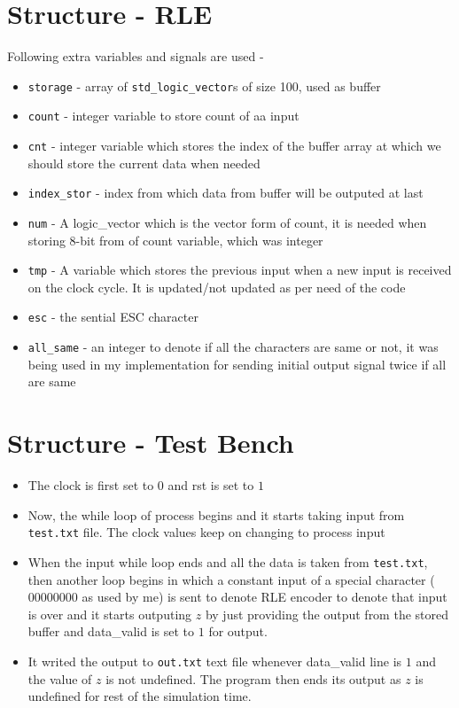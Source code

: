 \documentclass[12pt,a4paper]{article}
\begin{document}
\section{Structure - RLE}
Following extra variables and signals are used - 
\begin{itemize}
    \item \texttt{storage}  - array of \texttt{std\_logic\_vector}s of size 100, used as buffer
    \item \texttt{count} - integer variable to store count of aa input
    \item \texttt{cnt} - integer variable which stores the index of the buffer array at which we should store the current data when needed
    \item \texttt{index\_stor} - index from which data from buffer will be outputed at last
    \item \texttt{num} - A logic\_vector which is the vector form of count, it is needed when storing 8-bit from of count variable, which was integer
    \item \texttt{tmp} - A variable which stores the previous input when a new input is received on the clock cycle. It is updated/not updated as per need of the code
    \item \texttt{esc} - the sential ESC character
    \item \texttt{all\_same} - an integer to denote if all the characters are same or not, it was being used in my implementation for sending initial output signal twice if all are same
\end{itemize}
\section{Structure - Test Bench}
\begin{itemize}
    \item The clock is first set to $0$ and rst is set to $1$
    \item Now, the while loop of process begins and it starts taking input from \texttt{test.txt} file. The clock values keep on changing to process input
    \item When the input while loop ends and all the data is taken from \texttt{test.txt}, then another loop begins in which a constant input of a special character ($00000000$ as used by me) is sent to denote RLE encoder to denote that input is over and it starts outputing $z$ by just providing the output from the stored buffer and data\_valid is set to $1$ for output. 
    \item It writed the output to \texttt{out.txt} text file whenever data\_valid line is $1$ and the value of $z$ is not undefined. The program then ends its output as $z$ is undefined for rest of the simulation time.
\end{itemize}
\end{document}
